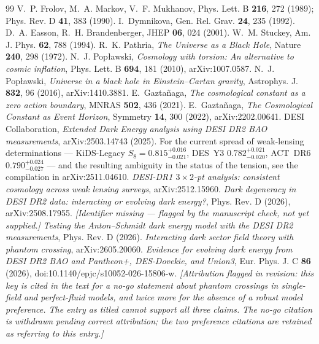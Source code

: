 \documentclass[11pt]{article}
\begin{document}
\begin{thebibliography}{99}
 V.~P. Frolov, M.~A. Markov, V.~F. Mukhanov, Phys. Lett. B \textbf{216}, 272 (1989); Phys. Rev. D \textbf{41}, 383 (1990).
 I.~Dymnikova, Gen. Rel. Grav. \textbf{24}, 235 (1992).
 D.~A. Easson, R.~H. Brandenberger, JHEP \textbf{06}, 024 (2001).
 W.~M. Stuckey, Am. J. Phys. \textbf{62}, 788 (1994).
 R.~K. Pathria, \emph{The Universe as a Black Hole}, Nature \textbf{240}, 298 (1972).
 N.~J. Pop{\l}awski, \emph{Cosmology with torsion: An alternative to cosmic inflation}, Phys. Lett. B \textbf{694}, 181 (2010), arXiv:1007.0587.
 N.~J. Pop{\l}awski, \emph{Universe in a black hole in Einstein--Cartan gravity}, Astrophys. J. \textbf{832}, 96 (2016), arXiv:1410.3881.
 E.~Gazta\~naga, \emph{The cosmological constant as a zero action boundary}, MNRAS \textbf{502}, 436 (2021).
 E.~Gazta\~naga, \emph{The Cosmological Constant as Event Horizon}, Symmetry \textbf{14}, 300 (2022), arXiv:2202.00641.
 DESI Collaboration, \emph{Extended Dark Energy analysis using DESI DR2 BAO measurements}, arXiv:2503.14743 (2025).
 For the current spread of weak-lensing determinations --- KiDS-Legacy $S_8 = 0.815^{+0.016}_{-0.021}$, DES~Y3 $0.782^{+0.021}_{-0.020}$, ACT~DR6 $0.790^{+0.024}_{-0.027}$ --- and the resulting ambiguity in the status of the tension, see the compilation in arXiv:2511.04610.
 \emph{DESI-DR1 $3\times2$-pt analysis: consistent cosmology across weak lensing surveys}, arXiv:2512.15960.
 \emph{Dark degeneracy in DESI DR2 data: interacting or evolving dark energy?}, Phys. Rev. D (2026), arXiv:2508.17955.
 \emph{[Identifier missing --- flagged by the manuscript check, not yet supplied.]} \emph{Testing the Anton--Schmidt dark energy model with the DESI DR2 measurements}, Phys. Rev. D (2026).
 \emph{Interacting dark sector field theory with phantom crossing}, arXiv:2605.20060.
 \emph{Evidence for evolving dark energy from DESI DR2 BAO and Pantheon+, DES-Dovekie, and Union3}, Eur. Phys. J. C \textbf{86} (2026), doi:10.1140/epjc/s10052-026-15806-w.  \emph{[Attribution flagged in revision: this key is cited in the text for a no-go statement about phantom crossings in single-field and perfect-fluid models, and twice more for the absence of a robust model preference. The entry as titled cannot support all three claims. The no-go citation is withdrawn pending correct attribution; the two preference citations are retained as referring to this entry.]}

\end{thebibliography}
\end{document}
